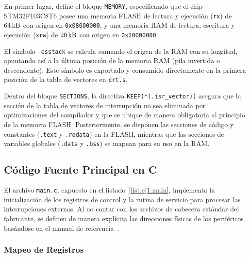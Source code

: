 En primer lugar, define el bloque \texttt{MEMORY}, especificando que el chip STM32F103C8T6 posee una memoria FLASH de lectura
y ejecución (\texttt{rx}) de $64\,\mathrm{kB}$ con origen en \texttt{0x08000000}, y una memoria RAM de lectura, escritura y ejecución
(\texttt{xrw}) de $20\,\mathrm{kB}$ con origen en \texttt{0x20000000}.

El símbolo \texttt{\_esstack} se calcula sumando el origen de la RAM con su longitud, apuntando así a la última posición de la
memoria RAM (pila invertida o descendente). Este símbolo es exportado y consumido directamente en la primera posición de la
tabla de vectores en \texttt{crt.s}.

Dentro del bloque \texttt{SECTIONS}, la directiva \texttt{KEEP(*(.isr\_vector))} asegura que la sección de la tabla de vectores
de interrupción no sea eliminada por optimizaciones del compilador y que se ubique de manera obligatoria al principio de la
memoria FLASH. Posteriormente, se disponen las secciones de código y constantes (\texttt{.text} y \texttt{.rodata}) en la FLASH,
mientras que las secciones de variables globales (\texttt{.data} y \texttt{.bss}) se mapean para su uso en la RAM.



\subsection{Código Fuente Principal en C}
\label{sec.ej1:codigo_c}

El archivo \texttt{main.c}, expuesto en el listado~\ref{list.ej1:main}, implementa la inicialización de los registros
de control y la rutina de servicio para procesar las interrupciones externas. Al no contar con los archivos de cabecera estándar del fabricante,
se definen de manera explícita las direcciones físicas de los periféricos basándose en el manual de referencia~\cite{stm32f103rm}.

\subsubsection{Mapeo de Registros}


